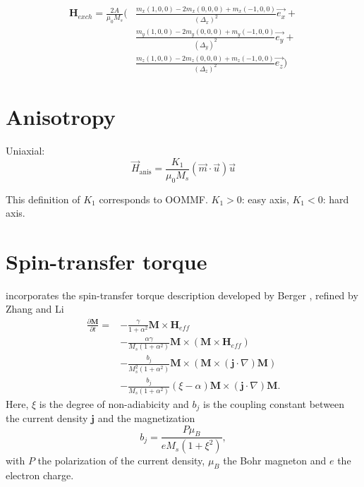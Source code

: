 \begin{equation}
\begin{split}
\mathbf{H}_{exch} = \frac{2A}{\mu_0 M_s} (&  \frac{m_x(1, 0, 0) -2m_x(0, 0 ,0) + m_x(-1, 0, 0)}{(\Delta_x)^2} \vec{e_x} +\\&  \frac{m_y(1, 0, 0) -2m_y(0, 0 ,0) + m_y(-1, 0, 0)}{(\Delta_y)^2} \vec{e_y} + \\& \frac{m_z(1, 0, 0) -2m_z(0, 0 ,0) + m_z(-1, 0, 0)}{(\Delta_z)^2} \vec{e_z} )
\end{split}
\end{equation}

\section{Anisotropy}

Uniaxial:
\begin{equation}
	\vec{H}_\mathrm{anis} = \frac{K_1}{\mu_0 M_s} (\vec{m} \cdot \vec{u}) \vec{u}
\end{equation}

This definition of $K_1$ corresponds to OOMMF. $K_1 > 0$: easy axis, $K_1 < 0$: hard axis.

\section{Spin-transfer torque}

\mumax incorporates the spin-transfer torque description developed by Berger \cite{Berger1996}, refined by Zhang and Li \cite{Zhang2004}
\begin{equation}
\begin{split}
\frac{\partial \mathbf{M}}{\partial t} = &-\frac{\gamma}{1+ \alpha^2}\mathbf{M}\times \mathbf{H}_{eff} \\
&- \frac{\alpha\gamma}{M_s(1+\alpha^2)}\mathbf{M}\times(\mathbf{M}\times \mathbf{H}_{eff})\\
&- \frac{b_j}{M_s^2(1+\alpha^2)}\mathbf{M}\times\left(\mathbf{M}\times (\mathbf{j}\cdot\nabla)\mathbf{M}\right)\\
&- \frac{b_j}{M_s(1+\alpha^2)}(\xi-\alpha) \mathbf{M}\times (\mathbf{j}\cdot\nabla)\mathbf{M}.\label{STT}
\end{split}
\end{equation}
Here, $\xi$ is the degree of non-adiabicity and $b_j$ is the coupling constant between the current density $\mathbf{j}$ and the magnetization
\begin{equation}
b_j = \frac{P \mu_B}{eM_s(1+\xi^2)},
\end{equation}
with $P$ the polarization of the current density,  $\mu_B$ the Bohr magneton and $e$ the electron charge.



